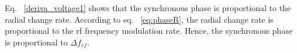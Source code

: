 \begin{itemize}
Eq. ~\ref{deriva_voltage1} shows that the synchronous phase is proportional to the radial change rate. According to eq. ~\ref{eq:phaseR}, the radial change rate is proportional to the rf frequency modulation rate. Hence, the synchronous phase is proportional to $\dot{\Delta f_{\mathit{rf}}}$. 
%
%
%





\end{itemize}
